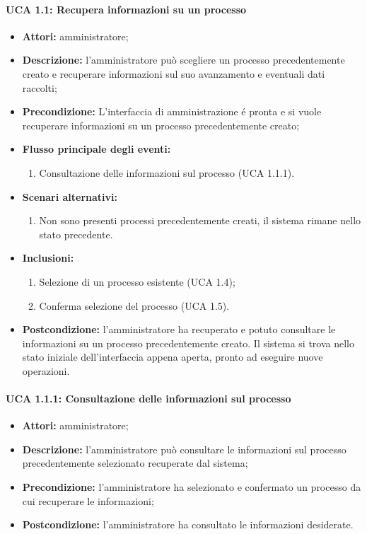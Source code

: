 \paragraph{UCA 1.1: Recupera informazioni su un processo}
\begin{itemize}
\item \textbf{Attori:} amministratore;
\item \textbf{Descrizione:} 
l'amministratore può scegliere un processo precedentemente creato e recuperare informazioni sul suo avanzamento e eventuali dati raccolti; 
\item \textbf{Precondizione:} 
L'interfaccia di amministrazione é pronta e si vuole recuperare informazioni su un processo precedentemente creato;
\item \textbf{Flusso principale degli eventi:} 
\begin{enumerate}
\item Consultazione delle informazioni sul processo (UCA 1.1.1).
\end{enumerate}
\item \textbf{Scenari alternativi:}
\begin{enumerate}
\item Non sono presenti processi precedentemente creati, il sistema rimane nello stato precedente.
\end{enumerate}
\item \textbf{Inclusioni:}
\begin{enumerate}
\item Selezione di un processo esistente (UCA 1.4);
\item Conferma selezione del processo (UCA 1.5).
\end{enumerate}
\item \textbf{Postcondizione:} 
l'amministratore ha recuperato e potuto consultare le informazioni su un processo precedentemente creato. Il sistema si trova nello stato iniziale dell'interfaccia appena aperta, pronto ad eseguire nuove operazioni.
\end{itemize}

\paragraph{UCA 1.1.1: Consultazione delle informazioni sul processo}
\begin{itemize}
\item \textbf{Attori:} 
amministratore;
\item \textbf{Descrizione:} 
l'amministratore può consultare le informazioni sul processo precedentemente selezionato recuperate dal sistema; 
\item \textbf{Precondizione:} 
l'amministratore ha selezionato e confermato un processo da cui recuperare le informazioni;
\item \textbf{Postcondizione:} 
l'amministratore ha consultato le informazioni desiderate.
\end{itemize}

